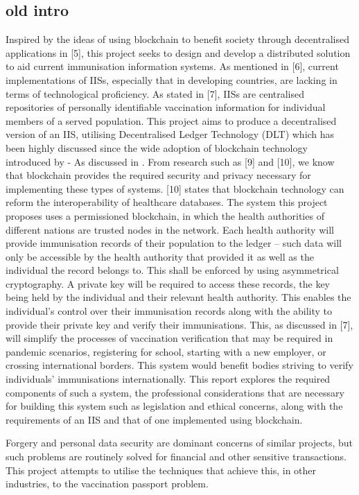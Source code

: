 \documentclass{report}
\begin{document}
\begin{flushleft}
\section{old intro}
Inspired by the ideas of using blockchain to benefit society
through decentralised applications in [5], this project seeks to
design and develop a distributed solution to aid current
immunisation information systems. As mentioned in [6],
current implementations of IISs, especially that in developing
countries, are lacking in terms of technological proficiency.
As stated in [7], IISs are centralised repositories of personally
identifiable vaccination information for individual members of
a served population. This project aims to produce a
decentralised version of an IIS, utilising Decentralised Ledger Technology (DLT) 
which has been highly discussed since the wide adoption of blockchain technology introduced by \cite{nakamoto_bitcoin_2019} - As discussed in \cite{sunyaev_distributed_2020}.
From research such as [9] and [10], we know that blockchain provides the
required security and privacy necessary for implementing
these types of systems. [10] states that blockchain technology
can reform the interoperability of healthcare databases.
The system this project proposes uses a permissioned
blockchain, in which the health authorities of different nations
are trusted nodes in the network. Each health authority will
provide immunisation records of their population to the ledger
– such data will only be accessible by the health authority that
provided it as well as the individual the record belongs to.
This shall be enforced by using asymmetrical cryptography. A
private key will be required to access these records, the key
being held by the individual and their relevant health
authority. This enables the individual’s control over their
immunisation records along with the ability to provide their
private key and verify their immunisations. This, as discussed
in [7], will simplify the processes of vaccination verification
that may be required in pandemic scenarios, registering for
school, starting with a new employer, or crossing international
borders. This system would benefit bodies striving to verify
individuals’ immunisations internationally.
This report explores the required components of such a
system, the professional considerations that are necessary for
building this system such as legislation and ethical concerns,
along with the requirements of an IIS and that of one
implemented using blockchain.

Forgery and personal data security are dominant concerns of similar projects, but such problems are routinely solved for financial and other sensitive transactions. \cite{dye_covid-19_2021}
This project attempts to utilise the techniques that achieve this, in other industries, to the vaccination passport problem. %


\end{flushleft}
\end{document}
